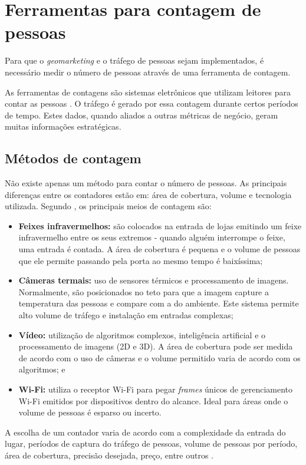 \section{Ferramentas para contagem de pessoas}
Para que o \emph{geomarketing} e o tráfego de pessoas sejam implementados, é necessário medir o número
de pessoas através de uma ferramenta de contagem.

As ferramentas de contagens são sistemas eletrônicos que utilizam leitores para contar as pessoas
\cite{trafsysdef}. O tráfego é gerado por essa contagem durante
certos períodos de tempo. Estes dados, quando aliados a outras métricas de
negócio, geram muitas informações estratégicas.

\subsection{Métodos de contagem}
Não existe apenas um método para contar o número de pessoas. As principais
diferenças entre os contadores estão em: área de cobertura, volume e tecnologia
utilizada. Segundo , os principais meios de
contagem são:

\begin{itemize}
  \item \textbf{Feixes infravermelhos:} são colocados
na entrada de lojas emitindo um feixe infravermelho entre os seus extremos -
quando alguém interrompe o feixe, uma entrada é contada. A área de cobertura é
pequena e o volume de pessoas que ele permite passando pela porta ao mesmo
tempo é baixíssima;
  \item \textbf{Câmeras termais:} uso de sensores térmicos e
processamento de imagens. Normalmente,
são posicionados no teto para que a imagem capture a temperatura das pessoas
e compare com a do ambiente. Este sistema permite alto volume de tráfego e instalação em entradas complexas;
  \item \textbf{Vídeo:} utilização de algoritmos complexos, inteligência artificial
   e o processamento de imagens (2D e 3D). A área de cobertura
  pode ser medida de acordo com o uso de câmeras e o volume permitido varia de acordo com os algoritmos; e
  \item \textbf{Wi-Fi:} utiliza o receptor Wi-Fi para pegar \emph{frames} únicos de gerenciamento Wi-Fi emitidos por dispositivos
  dentro do alcance. Ideal para áreas onde o volume de pessoas é esparso ou incerto.
\end{itemize}

A escolha de um contador varia de acordo com a complexidade da entrada do lugar, períodos de captura do tráfego de pessoas,
volume de pessoas por período, área de cobertura, precisão desejada, preço, entre outros \cite{trafsys} \cite{Axper2017}.


